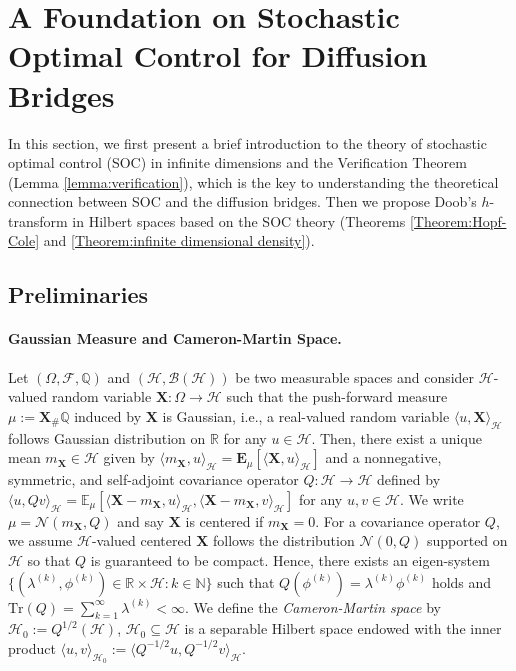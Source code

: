 \documentclass[nohyperref]{article}
\theoremstyle{plain}
\theoremstyle{remark}
\newcommand{\la}{\langle}
\newcommand{\ra}{\rangle}
\newcommand{\mc}{\mathcal}
\newcommand{\mb}{\mathbf}
\begin{document}
\section{A Foundation on Stochastic Optimal Control for Diffusion Bridges}
In this section, we first present a brief introduction to the theory of stochastic optimal control (SOC) in infinite dimensions and the Verification Theorem (Lemma \ref{lemma:verification}), which is the key to understanding the theoretical connection between SOC and the diffusion bridges. 
Then we propose Doob's $h$-transform in Hilbert spaces based on the SOC theory (Theorems \ref{Theorem:Hopf-Cole} and \ref{Theorem:infinite dimensional density}).


\subsection{Preliminaries}


\paragraph{Gaussian Measure and Cameron-Martin Space.} 
Let $(\Omega, \mc{F}, \mathbb{Q})$ and $(\mc{H}, \mc{B}(\mc{H}))$ be two measurable spaces and consider $\mc{H}$-valued random variable $\mb{X}:\Omega \to \mc{H}$ such that the push-forward measure $\mu := \mb{X}_{\#} \mathbb{Q}$ induced by $\mb{X}$ is Gaussian, i.e., a real-valued random variable $\la u, \mb{X} \ra_{\mc{H}}$ follows Gaussian distribution on $\mathbb{R}$ for any $u \in \mc{H}$. 
Then, there exist a unique mean $m_{\mb{X}} \in \mc{H}$ given by $\la m_{\mb{X}}, u\ra_{\mc{H}} = \mb{E}_{\mu}\left[\la \mb{X}, u \ra_{\mc{H}}\right]$ and a nonnegative, symmetric, and self-adjoint covariance operator $Q : \mc{H} \to \mc{H}$ defined by $\la u, Qv \ra_{\mc{H}} = \mathbb{E}_{\mu}\left[ \la \mb{X} - m_{\mb{X}}, u\ra_{\mc{H}}, \la \mb{X} - m_{\mb{X}}, v\ra_{\mc{H}} \right]$ for any $u, v \in \mc{H}$. 
We write $\mu = \mc{N}(m_{\mb{X}}, Q)$ and say $\mb{X}$ is centered if $m_{\mb{X}} = 0$.
For a covariance operator $Q$, 
we assume $\mc{H}$-valued centered $\mb{X}$ follows the distribution $\mc{N}(0, Q)$ supported on $\mc{H}$ so that $Q$ is guaranteed to be compact. 
Hence, there exists an eigen-system $\{(\lambda^{(k)}, \phi^{(k)}) \in \mathbb{R} \times \mc{H} : k \in \mathbb{N}\}$ such that $Q(\phi^{(k)}) = \lambda^{(k)} \phi^{(k)}$ holds and $\text{Tr}(Q) = \sum_{k=1}^{\infty} \lambda^{(k)} < \infty$. 
We define the \textit{Cameron-Martin space} by $\mc{H}_0 := Q^{1/2}(\mc{H})$, $\mc{H}_0 \subseteq \mc{H}$ is a separable Hilbert space endowed with the inner product $\la u, v \ra_{\mc{H}_0} := \la Q^{-1/2}u, Q^{-1/2}v\ra_{\mc{H}}$.
\end{document}
